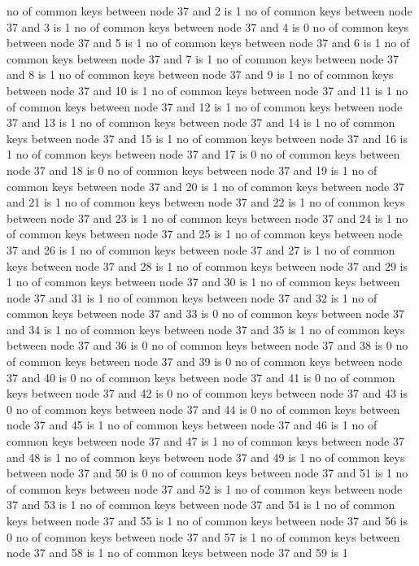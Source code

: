no of common keys between node 37 and 2 is 1
no of common keys between node 37 and 3 is 1
no of common keys between node 37 and 4 is 0
no of common keys between node 37 and 5 is 1
no of common keys between node 37 and 6 is 1
no of common keys between node 37 and 7 is 1
no of common keys between node 37 and 8 is 1
no of common keys between node 37 and 9 is 1
no of common keys between node 37 and 10 is 1
no of common keys between node 37 and 11 is 1
no of common keys between node 37 and 12 is 1
no of common keys between node 37 and 13 is 1
no of common keys between node 37 and 14 is 1
no of common keys between node 37 and 15 is 1
no of common keys between node 37 and 16 is 1
no of common keys between node 37 and 17 is 0
no of common keys between node 37 and 18 is 0
no of common keys between node 37 and 19 is 1
no of common keys between node 37 and 20 is 1
no of common keys between node 37 and 21 is 1
no of common keys between node 37 and 22 is 1
no of common keys between node 37 and 23 is 1
no of common keys between node 37 and 24 is 1
no of common keys between node 37 and 25 is 1
no of common keys between node 37 and 26 is 1
no of common keys between node 37 and 27 is 1
no of common keys between node 37 and 28 is 1
no of common keys between node 37 and 29 is 1
no of common keys between node 37 and 30 is 1
no of common keys between node 37 and 31 is 1
no of common keys between node 37 and 32 is 1
no of common keys between node 37 and 33 is 0
no of common keys between node 37 and 34 is 1
no of common keys between node 37 and 35 is 1
no of common keys between node 37 and 36 is 0
no of common keys between node 37 and 38 is 0
no of common keys between node 37 and 39 is 0
no of common keys between node 37 and 40 is 0
no of common keys between node 37 and 41 is 0
no of common keys between node 37 and 42 is 0
no of common keys between node 37 and 43 is 0
no of common keys between node 37 and 44 is 0
no of common keys between node 37 and 45 is 1
no of common keys between node 37 and 46 is 1
no of common keys between node 37 and 47 is 1
no of common keys between node 37 and 48 is 1
no of common keys between node 37 and 49 is 1
no of common keys between node 37 and 50 is 0
no of common keys between node 37 and 51 is 1
no of common keys between node 37 and 52 is 1
no of common keys between node 37 and 53 is 1
no of common keys between node 37 and 54 is 1
no of common keys between node 37 and 55 is 1
no of common keys between node 37 and 56 is 0
no of common keys between node 37 and 57 is 1
no of common keys between node 37 and 58 is 1
no of common keys between node 37 and 59 is 1
